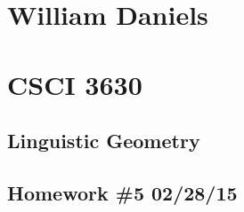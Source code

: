 \documentclass[11pt]{article}
\begin{document}
\begin{center}
\section*{William Daniels}
\section*{CSCI 3630}
\subsection*{Linguistic Geometry}
\subsection*{Homework \#5 02/28/15}
\end{center}

\vspace{.25cm}
\end{document}
